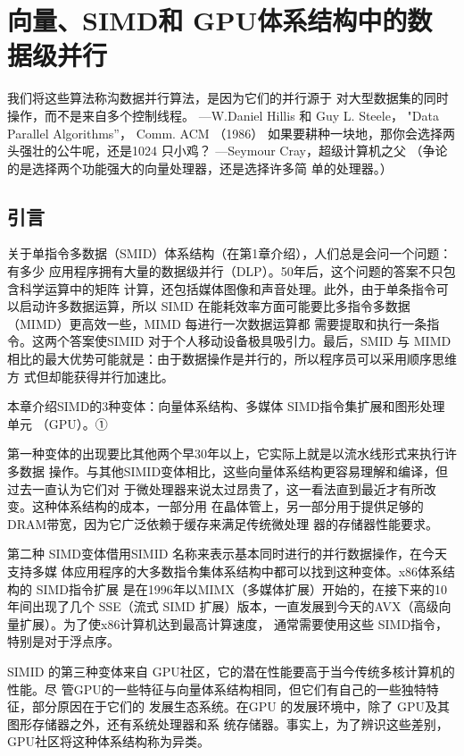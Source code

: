 

\chapter{向量、SIMD和 GPU体系结构中的数据级并行}
我们将这些算法称沟数据并行算法，是因为它们的并行源于
对大型数据集的同时操作，而不是来自多个控制线程。
—W.Daniel Hillis 和 Guy L. Steele，
"Data Parallel Algorithms”， Comm. ACM （1986）
如果要耕种一块地，那你会选择两头强壮的公牛呢，还是1024
只小鸡？
—Seymour Cray，超级计算机之父
（争论的是选择两个功能强大的向量处理器，还是选择许多简
单的处理器。）

\section{引言}
关于单指令多数据（SMID）体系结构（在第1章介绍），人们总是会问一个问题：有多少
应用程序拥有大量的数据级并行（DLP）。50年后，这个问题的答案不只包含科学运算中的矩阵
计算，还包括媒体图像和声音处理。此外，由于单条指令可以启动许多数据运算，所以 SIMD
在能耗效率方面可能要比多指令多数据（MIMD）更高效一些，MIMD 每进行一次数据运算都
需要提取和执行一条指令。这两个答案使SIMID 对于个人移动设备极具吸引力。最后，SMID
与 MIMD 相比的最大优势可能就是：由于数据操作是并行的，所以程序员可以采用顺序思维方
式但却能获得并行加速比。

本章介绍SIMD的3种变体：向量体系结构、多媒体 SIMD指令集扩展和图形处理单元
（GPU）。①

第一种变体的出现要比其他两个早30年以上，它实际上就是以流水线形式来执行许多数据
操作。与其他SIMID变体相比，这些向量体系结构更容易理解和编译，但过去一直认为它们对
于微处理器来说太过昂贵了，这一看法直到最近才有所改变。这种体系结构的成本，一部分用
在晶体管上，另一部分用于提供足够的DRAM带宽，因为它广泛依赖于缓存来满足传统微处理
器的存储器性能要求。

第二种 SIMD变体借用SIMID 名称来表示基本同时进行的并行数据操作，在今天支持多媒
体应用程序的大多数指令集体系结构中都可以找到这种变体。x86体系结构的 SIMD指令扩展
是在1996年以MIMX（多媒体扩展）开始的，在接下来的10年间出现了几个 SSE（流式 SIMD
扩展）版本，一直发展到今天的AVX（高级向量扩展）。为了使x86计算机达到最高计算速度，
通常需要使用这些 SIMD指令，特别是对于浮点序。

SIMID 的第三种变体来自 GPU社区，它的潜在性能要高于当今传统多核计算机的性能。尽
管GPU的一些特征与向量体系结构相同，但它们有自己的一些独特特征，部分原因在于它们的
发展生态系统。在GPU 的发展环境中，除了 GPU及其图形存储器之外，还有系统处理器和系
统存储器。事实上，为了辨识这些差别，GPU社区将这种体系结构称为异类。

